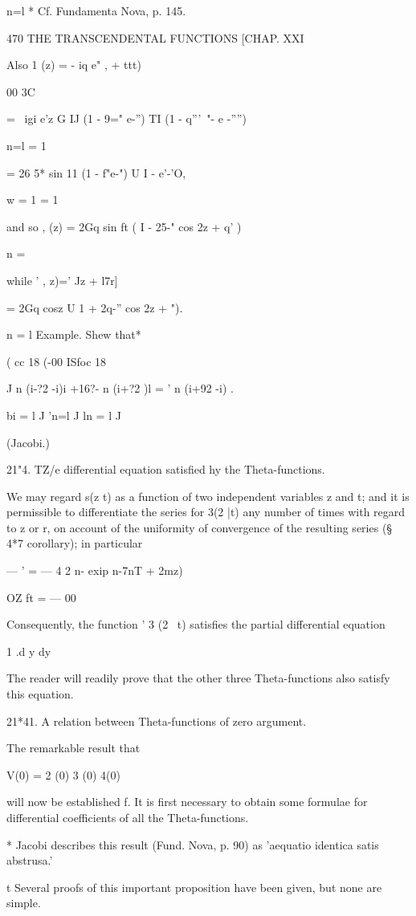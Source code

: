 n=l * Cf. Fundamenta Nova, p. 145.

470 THE TRANSCENDENTAL FUNCTIONS [CHAP. XXI

Also 1 (z) = - iq e" , + ttt)

00 3C

= \ igi e'z G IJ (1 - 9=" e-'') TI (1 - q'''~"- e -'''')

n=l = 1

= 26 5* sin 11 (1 - f"e-") U I - e'-'O,

w = 1 = 1

and so , (z) = 2Gq sin ft ( I - 25-" cos 2z + q' )

n = \

while ' , z)=' Jz + l7r]

= 2Gq cosz U 1 + 2q-'' cos 2z + ").

n = l Example. Shew that*

( cc 18 (-00 ISfoc 18

J n (i-?2 -i)i +16?- n (i+?2 )l = ' n (i+92 -i) .

bi = l J 'n=l J ln = l J

(Jacobi.)

21"4. TZ/e differential equation satisfied hy the Theta-functions.

We may regard s(z t) as a function of two independent variables z and
t; and it is permissible to differentiate the series for 3(2 |t) any
number of times with regard to z or r, on account of the uniformity of
convergence of the resulting series (§ 4*7 corollary); in particular

— ' = — 4 2 n- exip n-7nT + 2mz)

OZ ft = — 00

Consequently, the function ' 3 (2 \ t) satisfies the partial
differential equation

1 .d y dy

The reader will readily prove that the other three Theta-functions
also satisfy this equation.

21*41. A relation between Theta-functions of zero argument.

The remarkable result that

V(0) = 2 (0) 3 (0) 4(0)

will now be established f. It is first necessary to obtain some
formulae for differential coefficients of all the Theta-functions.

* Jacobi describes this result (Fund. Nova, p. 90) as 'aequatio
identica satis abstrusa.'

t Several proofs of this important proposition have been given, but
none are simple.

